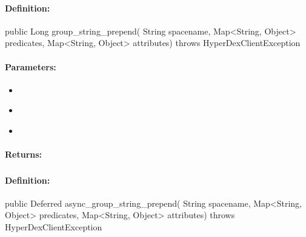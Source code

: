 \paragraph{Definition:}
\begin{javacode}
public Long group_string_prepend(
        String spacename,
        Map<String, Object> predicates,
        Map<String, Object> attributes) throws HyperDexClientException
\end{javacode}

\paragraph{Parameters:}
\begin{itemize}[noitemsep]
\item {}\\

\item {}\\

\item {}\\

\end{itemize}

\paragraph{Returns:}


\pagebreak
\subsubsection{}
\label{api:java:async_group_string_prepend}


\paragraph{Definition:}
\begin{javacode}
public Deferred async_group_string_prepend(
        String spacename,
        Map<String, Object> predicates,
        Map<String, Object> attributes) throws HyperDexClientException
\end{javacode}

